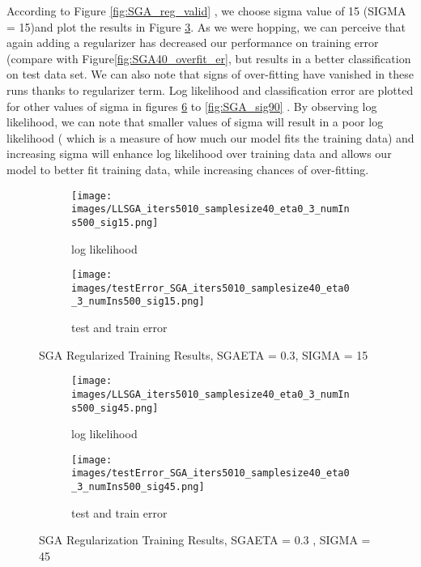 \documentclass[a4paper,11pt]{article}
\begin{document}
According to Figure \ref{fig:SGA_reg_valid} , we choose sigma value of 15 (SIGMA = 15)and plot the results in Figure \ref{fig:SGA_sig15}. As we were hopping, we can perceive that again adding a regularizer has decreased our performance on training error (compare with Figure\ref{fig:SGA40_overfit_er}, but results in a better classification on test data set. We can also note that signs of over-fitting have vanished in these runs thanks to regularizer term. Log likelihood and classification error are plotted for other values of sigma in figures \ref{fig:SGA_sig45} to \ref{fig:SGA_sig90} . By observing log likelihood, we can note that smaller values of sigma will result in a poor log likelihood ( which is a measure of how much our model fits the training data) and increasing sigma will enhance log likelihood over training data and allows our model to better fit training data, while increasing chances of over-fitting.
\begin{figure}[t]
\begin{subfigure}{.5\textwidth}
  \texttt{[image: images/LLSGA\_iters5010\_samplesize40\_eta0\_3\_numIns500\_sig15.png]}
	\centering
  \caption{log likelihood }
  \label{fig:LLSGA_sig15}
\end{subfigure}
\begin{subfigure}{.5\textwidth}
  \texttt{[image: images/testError\_SGA\_iters5010\_samplesize40\_eta0\_3\_numIns500\_sig15.png]}
	\centering
  \caption{test and train error  }
  \label{fig:SGA40_sig15_er}
\end{subfigure}
  \caption{SGA Regularized Training Results, SGA\underline{\hspace{.2cm}}ETA = 0.3, SIGMA = 15}
  \label{fig:SGA_sig15}
\end{figure}
\begin{figure}[t]
\begin{subfigure}{.5\textwidth}
  \texttt{[image: images/LLSGA\_iters5010\_samplesize40\_eta0\_3\_numIns500\_sig45.png]}
	\centering
  \caption{log likelihood }
  \label{fig:LLSGA_sig45}
\end{subfigure}
\begin{subfigure}{.5\textwidth}
  \texttt{[image: images/testError\_SGA\_iters5010\_samplesize40\_eta0\_3\_numIns500\_sig45.png]}
	\centering
  \caption{test and train error }
  \label{fig:SGA40_sig45_er}
\end{subfigure}
  \caption{SGA Regularization Training Results, SGA\underline{\hspace{.2cm}}ETA = 0.3 , SIGMA = 45}
  \label{fig:SGA_sig45}
\end{figure}
\end{document}
